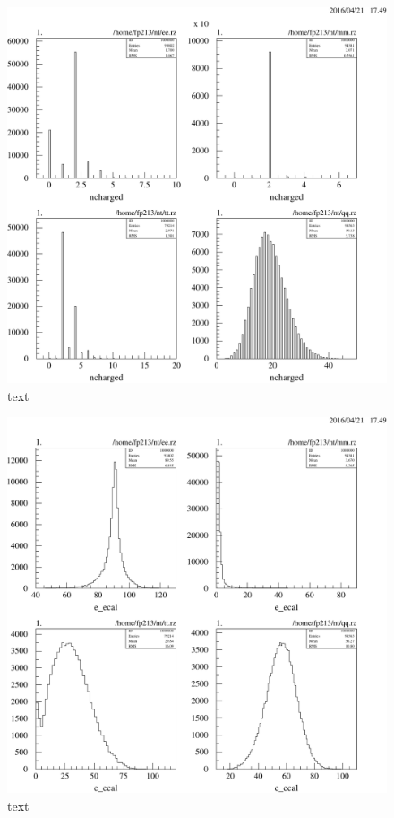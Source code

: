 \documentclass[11pt, a4paper]{article}
\numberwithin{equation}{section}
\begin{document}
\begin{appendix}
\begin{figure}[h]
	\centering
	\includegraphics[width=1\textwidth]{./data/tag2/uncut/cropped/ncharged_uncut.pdf}
	\caption{text}
\end{figure}

\begin{figure}[h]
	\centering
	\includegraphics[width=1\textwidth]{./data/tag2/uncut/cropped/e_ecal_uncut.pdf}
	\caption{text}
\end{figure}


\end{appendix}
\end{document}

